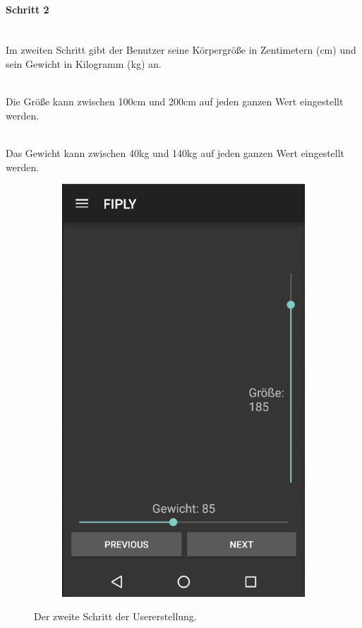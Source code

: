\documentclass[FIPLY_base.tex]{subfiles}
\begin{document}
\paragraph{Schritt 2}\ \\
Im zweiten Schritt gibt der Benutzer seine Körpergröße in Zentimetern (cm) und sein Gewicht in Kilogramm (kg) an.

\ \\
Die Größe kann zwischen 100cm und 200cm auf jeden ganzen Wert eingestellt werden.

\ \\
Das Gewicht kann zwischen 40kg und 140kg auf jeden ganzen Wert eingestellt werden.
\begin{figure}[H]
	\begin{subfigure}[b]{0.3\textwidth}
	\includegraphics[scale=0.55]{img/User_step2}
	\end{subfigure}
	\hfil
	\caption{Der zweite Schritt der Usererstellung.}
\end{figure}
\newpage
\end{document}
